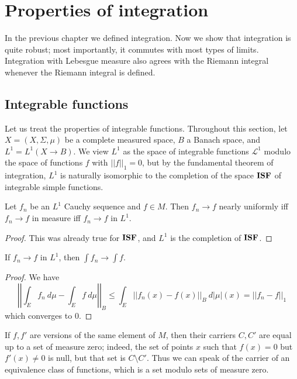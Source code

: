 \chapter{Properties of integration}
In the previous chapter we defined integration. Now we show that integration is quite robust; most importantly, it commutes with most types of limits.
Integration with Lebesgue measure also agrees with the Riemann integral whenever the Riemann integral is defined.

\section{Integrable functions}
Let us treat the properties of integrable functions.
Throughout this section, let $X = (X, \Sigma, \mu)$ be a complete measured space, $B$ a Banach space, and $L^{1} = L^{1}(X \to B)$.
We view $L^{1}$ as the space of integrable functions $\mathcal L^{1}$ modulo the space of functions $f$ with $||f||_{1} = 0$, but by the fundamental theorem of integration, $L^{1}$ is naturally isomorphic to the completion of the space $\mathbf{ISF}$ of integrable simple functions.

\begin{lemma}
Let $f_{n}$ be an $L^{1}$ Cauchy sequence and $f \in M$. Then $f_{n} \to f$ nearly uniformly iff $f_{n} \to f$ in measure iff $f_{n} \to f$ in $L^{1}$.
\end{lemma}
\begin{proof}
This was already true for $\mathbf{ISF}$, and $L^{1}$ is the completion of $\mathbf{ISF}$.
\end{proof}

\begin{lemma}
If $f_{n} \to f$ in $L^{1}$, then $\int f_{n} \to \int f$.
\end{lemma}
\begin{proof}
We have
\[\left|\left| \int_{E} f_{n} ~d\mu - \int_{E} f ~d\mu \right| \right|_{B} \leq \int_{E} ||f_{n}(x) - f(x)||_{B} ~d|\mu|(x) = ||f_{n} - f||_{1}\]
which converges to $0$.
\end{proof}

\begin{subsec}
If $f, f'$ are versions of the same element of $M$, then their carriers $C,C'$ are equal up to a set of measure zero; indeed, the set of points $x$ such that $f(x) = 0$ but $f'(x) \neq 0$ is null, but that set is $C \setminus C'$.
Thus we can speak of the carrier of an equivalence class of functions, which is a set modulo sets of measure zero.
\end{subsec}

